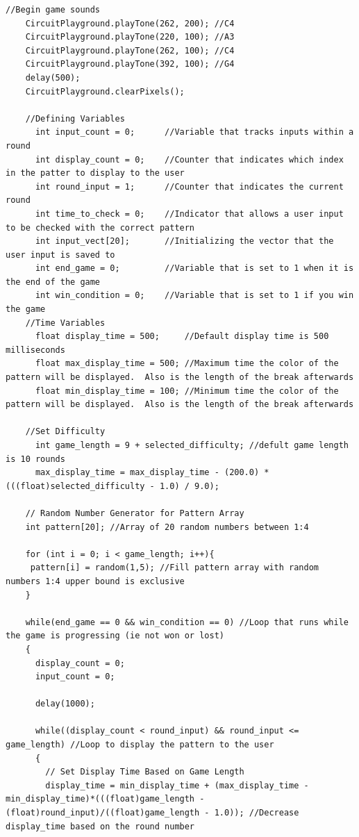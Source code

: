 \documentclass[12pt]{article}
\begin{document}
\begin{lstlisting}[language=Arduino]
    //Begin game sounds
    CircuitPlayground.playTone(262, 200); //C4
    CircuitPlayground.playTone(220, 100); //A3
    CircuitPlayground.playTone(262, 100); //C4
    CircuitPlayground.playTone(392, 100); //G4
    delay(500);
    CircuitPlayground.clearPixels();
    
    //Defining Variables
      int input_count = 0;      //Variable that tracks inputs within a round
      int display_count = 0;    //Counter that indicates which index in the patter to display to the user
      int round_input = 1;      //Counter that indicates the current round
      int time_to_check = 0;    //Indicator that allows a user input to be checked with the correct pattern
      int input_vect[20];       //Initializing the vector that the user input is saved to
      int end_game = 0;         //Variable that is set to 1 when it is the end of the game
      int win_condition = 0;    //Variable that is set to 1 if you win the game
    //Time Variables
      float display_time = 500;     //Default display time is 500 milliseconds
      float max_display_time = 500; //Maximum time the color of the pattern will be displayed.  Also is the length of the break afterwards
      float min_display_time = 100; //Minimum time the color of the pattern will be displayed.  Also is the length of the break afterwards
    
    //Set Difficulty
      int game_length = 9 + selected_difficulty; //defult game length is 10 rounds
      max_display_time = max_display_time - (200.0) * (((float)selected_difficulty - 1.0) / 9.0);

    // Random Number Generator for Pattern Array
    int pattern[20]; //Array of 20 random numbers between 1:4

    for (int i = 0; i < game_length; i++){
     pattern[i] = random(1,5); //Fill pattern array with random numbers 1:4 upper bound is exclusive
    }

    while(end_game == 0 && win_condition == 0) //Loop that runs while the game is progressing (ie not won or lost)
    {
      display_count = 0;
      input_count = 0;
      
      delay(1000);
      
      while((display_count < round_input) && round_input <= game_length) //Loop to display the pattern to the user
      {
        // Set Display Time Based on Game Length
        display_time = min_display_time + (max_display_time - min_display_time)*(((float)game_length - (float)round_input)/((float)game_length - 1.0)); //Decrease display_time based on the round number
        

\end{lstlisting}
\end{document}
